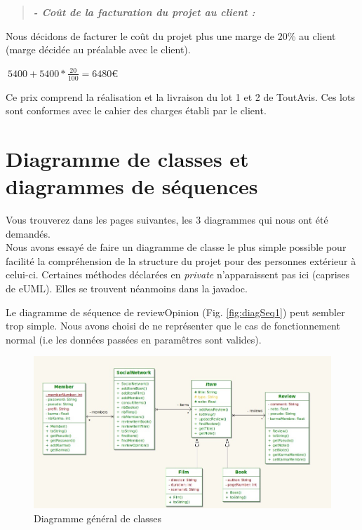 \documentclass[12pt,a4paper]{report}
\begin{document}
\begin{quotation}
\textbf{\textit{ - Coût de la facturation du projet au client :}}
\end{quotation}

Nous décidons de facturer le coût du projet plus une marge de 20\% au client (marge décidée au préalable avec le client).

$\ 5400+5400* \frac{20}{100} = 6480$\euro{}

Ce prix comprend la réalisation et la livraison du lot 1 et 2 de ToutAvis. Ces lots sont conformes avec le cahier des charges établi par le client.

\chapter*{Diagramme de classes et diagrammes de séquences}

\label{chapter:Diagramme de classes et diagrammes de séquences} %
Vous trouverez dans les pages suivantes, les 3 diagrammes qui nous ont été demandés. \\

Nous avons essayé de faire un diagramme de classe le plus simple possible pour facilité la compréhension de la structure du projet pour des personnes extérieur à celui-ci. Certaines méthodes déclarées en \emph{private} n'apparaissent pas ici (caprises de eUML). Elles se trouvent néanmoins dans la javadoc.

Le diagramme de séquence de reviewOpinion (Fig. \ref{fig:diagSeq1}) peut sembler trop simple. Nous avons choisi de ne représenter que le cas de fonctionnement normal (i.e les données passées en paramêtres sont valides). 

\begin{figure}[h]
\centering
\includegraphics[angle = 90, scale=0.8]{Classe1.jpeg}
\caption{Diagramme général de classes}
\label{fig:diagClasses1}
\end{figure}
\end{document}
